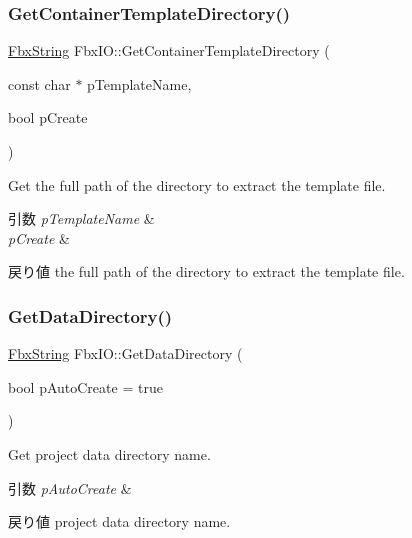 \subsubsection{\texorpdfstring{Get\+Container\+Template\+Directory()}{GetContainerTemplateDirectory()}}
{\footnotesize\ttfamily \hyperlink{class_fbx_string}{Fbx\+String} Fbx\+I\+O\+::\+Get\+Container\+Template\+Directory (\begin{DoxyParamCaption}\item[{const char $\ast$}]{p\+Template\+Name,  }\item[{bool}]{p\+Create }\end{DoxyParamCaption})}

Get the full path of the directory to extract the template file. 
\begin{DoxyParams}{引数}
{\em p\+Template\+Name} & \\
\hline
{\em p\+Create} & \\
\hline
\end{DoxyParams}
\begin{DoxyReturn}{戻り値}
the full path of the directory to extract the template file. 
\end{DoxyReturn}
\mbox{\label{class_fbx_i_o_a517013a57686934d9d18364f6f4fe3f5}} 
\subsubsection{\texorpdfstring{Get\+Data\+Directory()}{GetDataDirectory()}}
{\footnotesize\ttfamily \hyperlink{class_fbx_string}{Fbx\+String} Fbx\+I\+O\+::\+Get\+Data\+Directory (\begin{DoxyParamCaption}\item[{bool}]{p\+Auto\+Create = {\ttfamily true} }\end{DoxyParamCaption})}

Get project data directory name. 
\begin{DoxyParams}{引数}
{\em p\+Auto\+Create} & \\
\hline
\end{DoxyParams}
\begin{DoxyReturn}{戻り値}
project data directory name. 
\end{DoxyReturn}
\mbox{\label{class_fbx_i_o_a2ea4b80afa1146ffb14800046fa582d3}} 
